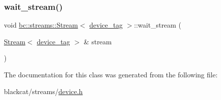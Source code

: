 \mbox{\label{classbc_1_1streams_1_1Stream_3_01device__tag_01_4_aa9fc028f6213e1d90ed9b464400f1551}} 
\subsubsection{\texorpdfstring{wait\+\_\+stream()}{wait\_stream()}}
{\footnotesize\ttfamily void \hyperlink{classbc_1_1streams_1_1Stream}{bc\+::streams\+::\+Stream}$<$ \hyperlink{structbc_1_1device__tag}{device\+\_\+tag} $>$\+::wait\+\_\+stream (\begin{DoxyParamCaption}\item[{\hyperlink{classbc_1_1streams_1_1Stream}{Stream}$<$ \hyperlink{structbc_1_1device__tag}{device\+\_\+tag} $>$ \&}]{stream }\end{DoxyParamCaption})\hspace{0.3cm}{\ttfamily [inline]}}



The documentation for this class was generated from the following file\+:\begin{DoxyCompactItemize}
\item 
blackcat/streams/\hyperlink{streams_2device_8h}{device.\+h}\end{DoxyCompactItemize}
